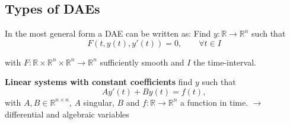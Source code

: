 	\subsection{Types of DAEs}
	\begin{frame}
		\vfill
		In the most general form a DAE can be written as:
		Find $y:\mathbb{R} \to \mathbb{R}^n$ such that
		\begin{equation}
			\label{Abstract_DAE}
			F(t, y(t), y'(t)) = 0, \qquad \forall t \in I
		\end{equation}
		
		with $F:\mathbb{R} \times \mathbb{R}^n \times \mathbb{R}^n \to \mathbb{R}^n$ sufficiently smooth and $I$ the time-interval.
		
		\textbf{Linear systems with constant coefficients} \newline
		find $y$ such that
		\begin{equation}
			\label{DAE-const-coeff}
			A y'(t) + B y(t) = f(t) ,
		\end{equation}
		with $A,B \in \mathbb{R}^{n \times n}$, $A$ singular, $B$  and $f:\mathbb{R} \to \mathbb{R}^n$ a function in time.
		$\to$ differential and algebraic variables
		\vfill
	\end{frame}
	
%			
%			

